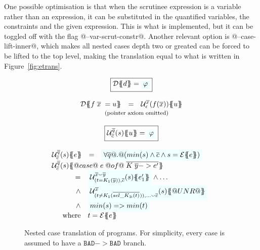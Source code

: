 One possible optimisation is that when the scrutinee
expression is a variable rather than an expression, it can be
substituted in the quantified variables, the constraints and the given
expression. This is what is implemented, but it can be toggled off
with the flag @--var-scrut-constr@. Another relevant option is
@--case-lift-inner@, which makes all nested cases
depth two or greated can be forced to be lifted to the top level,
making the translation equal to what is written in
Figure~\ref{fig:etrans}.

\newcommand{\ut}[4]{{\cal U}^{#1}_{#2}(#3)\{\!\!\{#4\}\!\!\}}

\begin{figure}\small
\setlength{\arraycolsep}{2pt}
\[\begin{array}{c}
\ruleform{\dtrans{\Sigma}{d} = \formula{\phi}} \\ \\
\begin{array}{rcl}
  \dtrans{\Sigma}{f \;\ol{x}\; = u}
    & = & \ut{\ol{x}}{\epsilon}{f(\ol{x})}{u} \\
\end{array} \\
\mbox{{\footnotesize (pointer axiom omitted)}}
\\ \\
\ruleform{\ut{\ol{q}}{\ol{c}}{s}{u} = \formula{\phi}} \\ \\
\begin{array}{rcl}
\ut{\ol{q}}{\ol{c}}{s}{e}
  & = & \formula{\forall \ol{q} @.@
    (min(s) \land \ol{c} \land s = \etrans{\Sigma}{\Gamma}{e})} \\
\multicolumn{3}{l}{\ut{\ol{q}}{\ol{c}}{s}
    {@case@\;e\;@of@\;\ol{K\;\ol{y} -> e'}}} \\
\multicolumn{3}{l}{
\quad
  \begin{array}[t]{rl}
    = & \formula{\ut{\ol{x} \smallsmile \ol{y}}{(t = K_1(\ol{y})) , \ol{c}}{s}{e'_1}} \land \ldots  \\
    \land & \formula{ \ut{\ol{x}}{(t \neq K_1(\oln{{\sel{K_1}{i}}(t)}{})) , \ldots \smallsmile \ol{c}}{s}{@UNR@} } \\
    \land & \formula{min(s) => min(t)} \\
    \mbox{where} & t  =  \etrans{\Sigma}{\Gamma}{e}
 \end{array}
}
\end{array}
\end{array}\]
\caption{Nested case translation of programs.
For simplicity, every case is assumed to have a $\mathtt{BAD} -> \mathtt{BAD}$ branch.
\label{fig:nested-case-trans}
}
\end{figure}

